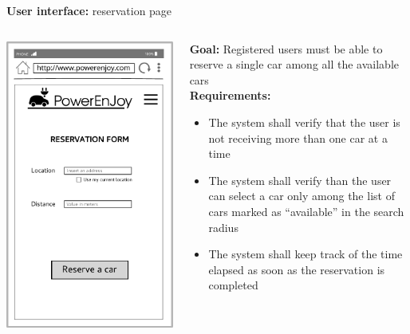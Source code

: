 \documentclass{beamer}
\begin{document}
	\begin{frame}{\textbf{User interface:} reservation page}
	\begin{columns}
		\begin{column}{0.4\textwidth}
			\includegraphics[width=0.9\columnwidth]{figures/reservation.pdf}
		\end{column}
		\begin{column}{0.5\textwidth}
			\textbf{Goal:} Registered users must be able to reserve a single car among all the available cars\\
			\textbf{Requirements:}
			\begin{itemize}
				\item The system shall verify that the user is not receiving more than one car at a time
				\item The system shall verify than the user can select a car only among the list of cars marked as ``available'' in the search radius
				\item The system shall keep track of the time elapsed as soon as the reservation is completed
			\end{itemize} 
		\end{column}
	\end{columns}
	\end{frame}	
\end{document}
